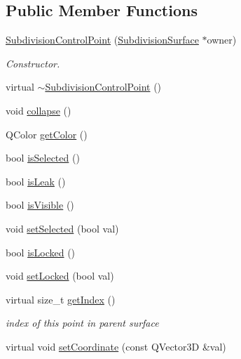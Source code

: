 \subsection*{Public Member Functions}
\begin{DoxyCompactItemize}
\item 
\hyperlink{classShipCAD_1_1SubdivisionControlPoint_a812f4e2343926ef41bc7104f0f7b1dd9}{Subdivision\-Control\-Point} (\hyperlink{classShipCAD_1_1SubdivisionSurface}{Subdivision\-Surface} $\ast$owner)
\begin{DoxyCompactList}\small\item\em Constructor. \end{DoxyCompactList}\item 
virtual \hyperlink{classShipCAD_1_1SubdivisionControlPoint_aed35211e2f60cd5ed1de628d732e4791}{$\sim$\-Subdivision\-Control\-Point} ()
\item 
void \hyperlink{classShipCAD_1_1SubdivisionControlPoint_a3c11cf5f0a22b44cbc8674a5d82942b0}{collapse} ()
\item 
Q\-Color \hyperlink{classShipCAD_1_1SubdivisionControlPoint_ad3af0386e8bb679a2037054ddbdb6a20}{get\-Color} ()
\item 
bool \hyperlink{classShipCAD_1_1SubdivisionControlPoint_af446fc02c7dc2e20383e741f71f4c358}{is\-Selected} ()
\item 
bool \hyperlink{classShipCAD_1_1SubdivisionControlPoint_a1d9150cdde6105519de95a94689faa51}{is\-Leak} ()
\item 
bool \hyperlink{classShipCAD_1_1SubdivisionControlPoint_ad739bf09eb693c8956101d0576736239}{is\-Visible} ()
\item 
void \hyperlink{classShipCAD_1_1SubdivisionControlPoint_a5642f57c7f17e78c27ad6edb0fdb7f65}{set\-Selected} (bool val)
\item 
bool \hyperlink{classShipCAD_1_1SubdivisionControlPoint_aacd7add9e1a79cc7e96c1ac6de568ad1}{is\-Locked} ()
\item 
void \hyperlink{classShipCAD_1_1SubdivisionControlPoint_a5f2cde3c54ca44c4b4d3ded0e3bc4ded}{set\-Locked} (bool val)
\item 
virtual size\-\_\-t \hyperlink{classShipCAD_1_1SubdivisionControlPoint_a13c569f0894ba6193a3abf894bc4b517}{get\-Index} ()
\begin{DoxyCompactList}\small\item\em index of this point in parent surface \end{DoxyCompactList}\item 
virtual void \hyperlink{classShipCAD_1_1SubdivisionControlPoint_a54a5233e02ef34a174c24d5dcf3c6407}{set\-Coordinate} (const Q\-Vector3\-D \&val)

\end{DoxyCompactItemize}
